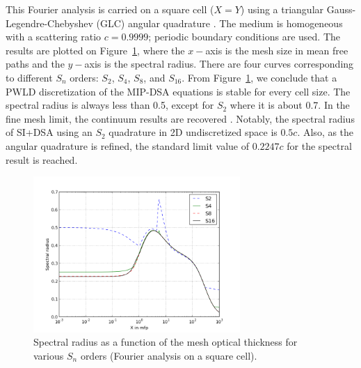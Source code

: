 \documentclass[preprint,10pt]{elsarticle}
\renewcommand{\(}{\left(}
\renewcommand{\)}{\right)}
\renewcommand{\[}{\left[}
\renewcommand{\]}{\right]}
\newcommand{\sn}{\ensuremath{S_n}\xspace}
\begin{document}
This Fourier analysis is carried on a square cell ($X=Y$) using a triangular 
Gauss-Legendre-Chebyshev (GLC) angular quadrature \cite{quadrature}. The medium is homogeneous with a 
scattering ratio $c=0.9999$; periodic boundary conditions are used. The results 
are plotted on Figure~\ref {fig_fa_sn}, where the $x-$axis is the mesh size in mean free 
paths and the $y-$axis is the spectral radius. There are four curves corresponding 
to different $S_n$ orders: $S_2$, $S_4$, $S_8$, and $S_{16}$.
From Figure~\ref {fig_fa_sn}, we conclude that a PWLD discretization of the MIP-DSA equations 
is stable for every cell size. The spectral radius is always less than 0.5, except for $S_2$ where 
it is about 0.7. In the fine mesh limit, the continuum results are recovered \cite{multisweep}. Notably,
the spectral radius of SI+DSA using an $S_2$ quadrature in 2D undiscretized space is $0.5c$. Also, as the angular 
quadrature is refined, the standard limit value of $0.2247c$ for the spectral result is reached.
\begin{figure}[!htbp]
  \centering
  \includegraphics[width=0.7\textwidth]{sn_order_9999}
  \caption{Spectral radius as a function of the mesh optical thickness for various \sn orders (Fourier analysis on a square cell).}
  \label{fig_fa_sn}
\end{figure}
\end{document}
